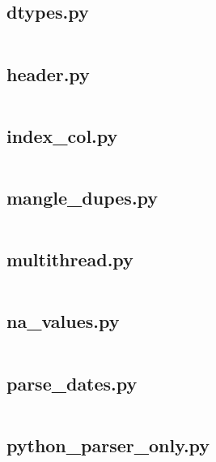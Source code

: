 \documentclass{article}
\begin{document}
\subsection{dtypes.py}
\inputminted{python}{/home/dufferzafar/dev/@clones/pandas/pandas/tests/io/parser/dtypes.py}
\newpage

\subsection{header.py}
\inputminted{python}{/home/dufferzafar/dev/@clones/pandas/pandas/tests/io/parser/header.py}
\newpage

\subsection{index\_col.py}
\inputminted{python}{/home/dufferzafar/dev/@clones/pandas/pandas/tests/io/parser/index_col.py}
\newpage

\subsection{mangle\_dupes.py}
\inputminted{python}{/home/dufferzafar/dev/@clones/pandas/pandas/tests/io/parser/mangle_dupes.py}
\newpage

\subsection{multithread.py}
\inputminted{python}{/home/dufferzafar/dev/@clones/pandas/pandas/tests/io/parser/multithread.py}
\newpage

\subsection{na\_values.py}
\inputminted{python}{/home/dufferzafar/dev/@clones/pandas/pandas/tests/io/parser/na_values.py}
\newpage

\subsection{parse\_dates.py}
\inputminted{python}{/home/dufferzafar/dev/@clones/pandas/pandas/tests/io/parser/parse_dates.py}
\newpage

\subsection{python\_parser\_only.py}
\inputminted{python}{/home/dufferzafar/dev/@clones/pandas/pandas/tests/io/parser/python_parser_only.py}
\newpage
\end{document}
